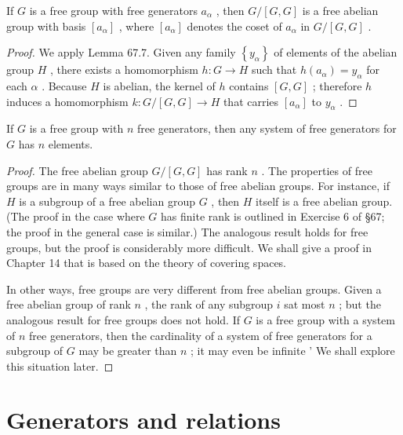 \begin{theorem} If \(G\) is a free group with free generators \({a}_{\alpha }\) , then \(G/\left\lbrack  {G,G}\right\rbrack\) is a free abelian group with basis \(\left\lbrack  {a}_{\alpha }\right\rbrack\) , where \(\left\lbrack  {a}_{\alpha }\right\rbrack\) denotes the coset of \({a}_{\alpha }\) in \(G/\left\lbrack  {G,G}\right\rbrack\) .
\end{theorem}

\begin{proof}We apply Lemma 67.7. Given any family \(\left\{  {y}_{\alpha }\right\}\) of elements of the abelian group \(H\) , there exists a homomorphism \(h : G \rightarrow  H\) such that \(h\left( {a}_{\alpha }\right)  = {y}_{\alpha }\) for each \(\alpha\) . Because \(H\) is abelian, the kernel of \(h\) contains \(\left\lbrack  {G,G}\right\rbrack\) ; therefore \(h\) induces a homomorphism \(k : G/\left\lbrack  {G,G}\right\rbrack \rightarrow  H\) that carries \(\left\lbrack  {a}_{\alpha }\right\rbrack\) to \({y}_{\alpha }\) .\end{proof}
\begin{corollary} If \(G\) is a free group with \(n\) free generators, then any system of free generators for \(G\) has \(n\) elements.
\end{corollary}

\begin{proof}The free abelian group \(G/\left\lbrack  {G,G}\right\rbrack\) has rank \(n\) .
The properties of free groups are in many ways similar to those of free abelian groups. For instance, if \(H\) is a subgroup of a free abelian group \(G\) , then \(H\) itself is a free abelian group. (The proof in the case where \(G\) has finite rank is outlined in Exercise 6 of  \S 67; the proof in the general case is similar.) The analogous result holds for free groups, but the proof is considerably more difficult. We shall give a proof in Chapter 14 that is based on the theory of covering spaces.

In other ways, free groups are very different from free abelian groups. Given a free abelian group of rank \(n\) , the rank of any subgroup \(i\) sat most \(n\) ; but the analogous result for free groups does not hold. If \(G\) is a free group with a system of \(n\) free generators, then the cardinality of a system of free generators for a subgroup of \(G\) may be greater than \(n\) ; it may even be infinite ’ We shall explore this situation later.
\end{proof}
\section*{Generators and relations}

